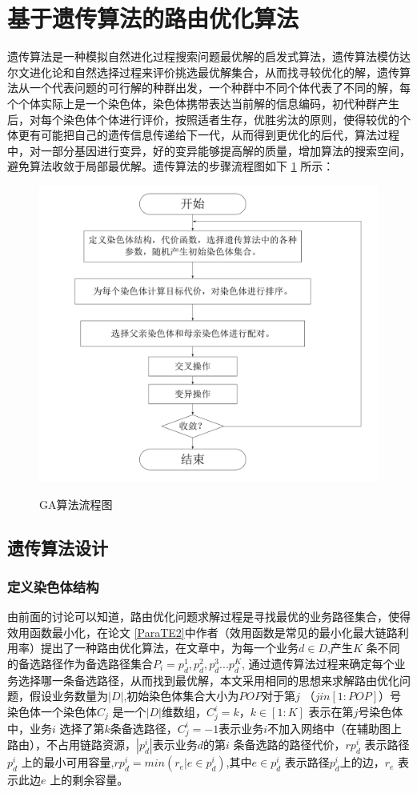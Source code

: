 \section{基于遗传算法的路由优化算法}
遗传算法是一种模拟自然进化过程搜索问题最优解的启发式算法，遗传算法模仿达尔文进化论和自然选择过程来评价挑选最优解集合，从而找寻较优化的解，遗传算法从一个代表问题的可行解的种群出发，一个种群中不同个体代表了不同的解，每个个体实际上是一个染色体，染色体携带表达当前解的信息编码，初代种群产生后，对每个染色体个体进行评价，按照适者生存，优胜劣汰的原则，使得较优的个体更有可能把自己的遗传信息传递给下一代，从而得到更优化的后代，算法过程中，对一部分基因进行变异，好的变异能够提高解的质量，增加算法的搜索空间，避免算法收敛于局部最优解。遗传算法的步骤流程图如下 \ref{IterNum} 所示：
\begin{figure}
\setlength{\belowcaptionskip}{-0.5cm}
  \begin{center}
    {\includegraphics[width=0.8 \textwidth]{figures/GAprocess.pdf}}
    \end{center}
  \caption{{\footnotesize{GA算法流程图}}}
  \label{IterNum}
\end{figure}
\subsection{遗传算法设计}
\subsubsection{定义染色体结构}

由前面的讨论可以知道，路由优化问题求解过程是寻找最优的业务路径集合，使得效用函数最小化，在论文 \ref{ParaTE2}中作者（效用函数是常见的最小化最大链路利用率）提出了一种路由优化算法，在文章中，为每一个业务$d \in D$,产生$K$ 条不同的备选路径作为备选路径集合$P_i={p^1_d,p^2_d,p^3_d...p^K_d}$, 通过遗传算法过程来确定每个业务选择哪一条备选路径，从而找到最优解，本文采用相同的思想来求解路由优化问题，假设业务数量为$|D|$,初始染色体集合大小为$POP$对于第$j$ （$j in [1:POP]$）号染色体一个染色体$C_j$ 是一个$|D|$维数组，$C^i_j=k，k \in[1:K]$ 表示在第$j$号染色体中，业务$i$ 选择了第$k$条备选路径，$C^i_j=-1$表示业务$i$不加入网络中（在辅助图上路由），不占用链路资源，$|p^i_d|$表示业务$d$的第$i$ 条备选路的路径代价，$rp^i_d$ 表示路径$p^i_d$ 上的最小可用容量,$rp^i_d=min(r_e|e \in p^i_d)$,其中$e \in p^i_d$ 表示路径$p^i_d$上的边，$r_e$ 表示此边$e$ 上的剩余容量。
